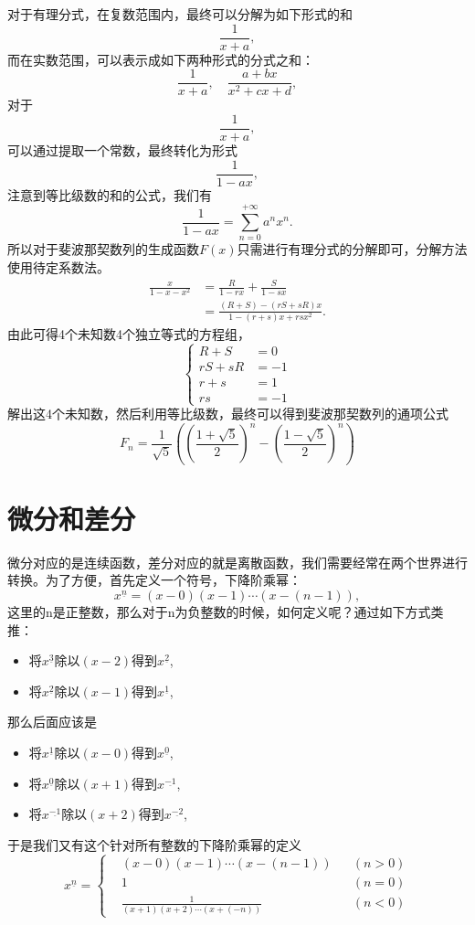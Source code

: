 \documentclass[cn]{elegantbook}
\begin{document}
对于有理分式，在复数范围内，最终可以分解为如下形式的和
\[
\frac{1}{x+a},
\]
而在实数范围，可以表示成如下两种形式的分式之和：
\[
\frac{1}{x+a}, \quad \frac{a+bx}{x^2+cx+d},
\]
对于
\[
\frac{1}{x+a},
\]
可以通过提取一个常数，最终转化为形式
\[
\frac{1}{1-ax},
\]
注意到等比级数的和的公式，我们有
\[
\frac{1}{1-ax} = \sum_{n=0}^{+\infty}{a^nx^n}.
\]
所以对于斐波那契数列的生成函数$F(x)$只需进行有理分式的分解即可，分解方法使用待定系数法。
\[
\begin{aligned}
\frac{x}{1-x-x^2} &= \frac{R}{1-rx} + \frac{S}{1-sx} \\
&=\frac{(R+S) - (rS + sR)x}{1 - (r+s)x + rsx^2}.
\end{aligned}
\]
由此可得4个未知数4个独立等式的方程组，
\[
\left\{
\begin{aligned}
R+S &= 0\\
rS+sR&= -1 \\
r+s &=1\\
rs&= -1
\end{aligned}
\right.
\]
解出这4个未知数，然后利用等比级数，最终可以得到斐波那契数列的通项公式
\[
F_n = \frac{1}{\sqrt{5}}((\frac{1 + \sqrt{5}}{2})^n - (\frac{1 - \sqrt{5}}{2})^n)
\]

\chapter{微分和差分}
微分对应的是连续函数，差分对应的就是离散函数，我们需要经常在两个世界进行转换。为了方便，首先定义一个符号，下降阶乘幂：
\[
x^{\underline{n}} = (x-0)(x-1)\cdots(x-(n-1)),
\]
这里的n是正整数，那么对于n为负整数的时候，如何定义呢？通过如下方式类推：
\begin{itemize}
\item 将$x^{\underline{3}}$除以$(x-2)$得到$x^{\underline{2}}$,
\item 将$x^{\underline{2}}$除以$(x-1)$得到$x^{\underline{1}}$,
\end{itemize}
那么后面应该是
\begin{itemize}
\item 将$x^{\underline{1}}$除以$(x-0)$得到$x^{\underline{0}}$,
\item 将$x^{\underline{0}}$除以$(x+1)$得到$x^{\underline{-1}}$,
\item 将$x^{\underline{-1}}$除以$(x+2)$得到$x^{\underline{-2}}$,
\end{itemize}
于是我们又有这个针对所有整数的下降阶乘幂的定义
\[
x^{\underline{n}} = \left\{
\begin{aligned}
&(x-0)(x-1)\cdots(x-(n-1)) &&(n > 0)\\
&1 &&(n=0)\\
&\frac{1}{(x+1)(x+2)\cdots(x+(-n))}&&(n<0)
\end{aligned}
\right.
\]
\end{document}

